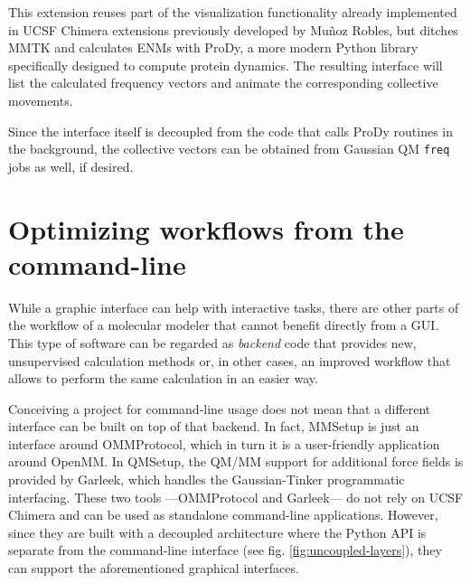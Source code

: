 This extension reuses part of the visualization functionality already implemented in UCSF Chimera extensions previously developed by Muñoz Robles,\cite{MunozRobles2014a} but ditches MMTK\cite{mmtk} and calculates ENMs with ProDy,\cite{prody} a more modern Python library specifically designed to compute protein dynamics. The resulting interface will list the calculated frequency vectors and animate the corresponding collective movements.

Since the interface itself is decoupled from the code that calls ProDy routines in the background, the collective vectors can be obtained from Gaussian QM \texttt{freq} jobs as well, if desired.


\section{Optimizing workflows from the command-line}
While a graphic interface can help with interactive tasks, there are other parts of the workflow of a molecular modeler that cannot benefit directly from a GUI. This type of software can be regarded as \textit{backend} code that provides new, unsupervised calculation methods or, in other cases, an improved workflow that allows to perform the same calculation in an easier way.

Conceiving a project for command-line usage does not mean that a different interface can be built on top of that backend. In fact, MMSetup is just an interface around OMMProtocol, which in turn it is a user-friendly application around OpenMM. In QMSetup, the QM/MM support for additional force fields is provided by Garleek, which handles the Gaussian-Tinker programmatic interfacing. These two tools ---OMMProtocol and Garleek--- do not rely on UCSF Chimera and can be used as standalone command-line applications. However, since they are built with a decoupled architecture where the Python API is separate from the command-line interface (see fig. \ref{fig:uncoupled-layers}), they can support the aforementioned graphical interfaces.


